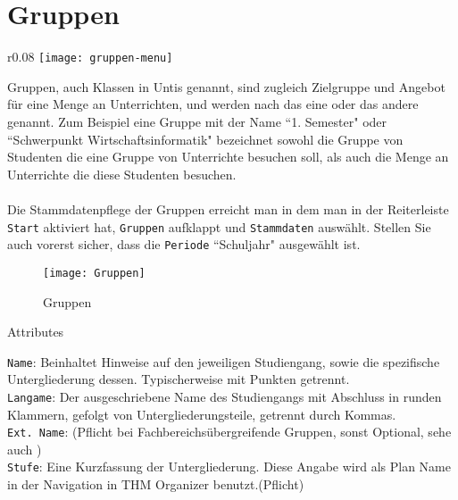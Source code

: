 \section{Gruppen}

\begin{wrapfigure}{r}{0.08\textwidth}
	\vspace{-70pt}
	\texttt{[image: gruppen-menu]}
\end{wrapfigure}

\vspace{25pt}

Gruppen, auch Klassen in Untis genannt, sind zugleich Zielgruppe und Angebot für eine Menge an Unterrichten, und werden nach das eine oder das andere genannt. Zum Beispiel eine Gruppe mit der Name ``1. Semester" oder ``Schwerpunkt Wirtschaftsinformatik" bezeichnet sowohl die Gruppe von Studenten die eine Gruppe von Unterrichte besuchen soll, als auch die Menge an Unterrichte die diese Studenten besuchen.\\
\\
Die Stammdatenpflege der Gruppen erreicht man in dem man in der Reiterleiste \texttt{Start} aktiviert hat, \texttt{Gruppen} aufklappt und \texttt{Stammdaten} auswählt. Stellen Sie auch vorerst sicher, dass die \texttt{Periode} ``Schuljahr" ausgewählt ist.

\begin{figure}[h]
	\texttt{[image: Gruppen]}
	\vspace{-15pt}
	\caption{Gruppen}
	\label{fig:groups}
\end{figure}

\noindent
{\large Attributes\par}
\vspace{8pt}

\noindent
\texttt{Name}: Beinhaltet Hinweise auf den jeweiligen Studiengang, sowie die spezifische Untergliederung dessen. Typischerweise mit Punkten getrennt.\\

\noindent
\texttt{Langame}: Der ausgeschriebene Name des Studiengangs mit Abschluss in runden Klammern, gefolgt von Untergliederungsteile, getrennt durch Kommas.\\

\noindent
\texttt{Ext. Name}: (Pflicht bei Fachbereichsübergreifende Gruppen, sonst Optional, sehe auch 
)\\

\noindent
\texttt{Stufe}: Eine Kurzfassung der Untergliederung. Diese Angabe wird als Plan Name in der Navigation in THM Organizer benutzt.(Pflicht)\\

